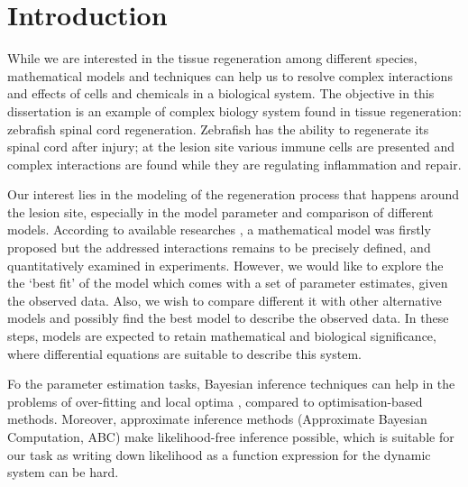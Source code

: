 \chapter{Introduction}





While we are interested in the tissue regeneration among different species, mathematical models and techniques can help us to resolve complex interactions and effects of cells and chemicals in a biological system. The objective in this dissertation is an example of complex biology system found in tissue regeneration: zebrafish spinal cord regeneration. Zebrafish has the ability to regenerate its spinal cord after injury; at the lesion site various immune cells are presented and complex interactions are found while they are regulating inflammation and repair.

Our interest lies in the modeling of the regeneration process that happens around the lesion site, especially in the model parameter and comparison of different models. According to available researches \cite{ref:Tsarouchas}, a mathematical model was firstly proposed but the addressed interactions remains to be precisely defined, and quantitatively examined in experiments. However, we would like to explore the the `best fit' of the model which comes with a set of parameter estimates, given the observed data. Also, we wish to compare different it with other alternative models and possibly find the best model to describe the observed data. In these steps, models are expected to retain mathematical and biological significance, where differential equations are suitable to describe this system.

Fo the parameter estimation tasks, Bayesian inference techniques can help in the problems of over-fitting and local optima \cite{ref:abcsysbio}, compared to optimisation-based methods. Moreover, approximate inference methods (Approximate Bayesian Computation, ABC) make likelihood-free inference possible, which is suitable for our task as writing down likelihood as a function expression for the dynamic system can be hard.

